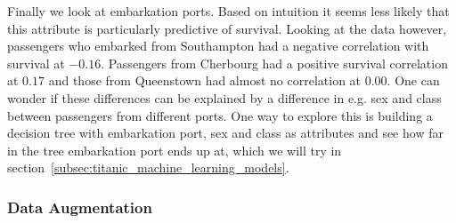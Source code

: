 \documentclass[english, a4paper]{article}
\begin{document}
\noindent
Finally we look at embarkation ports. Based on intuition it seems less likely that this attribute is particularly predictive of survival. Looking at the data however, passengers who embarked from Southampton had a negative correlation with survival at $-0.16$. Passengers from Cherbourg had a positive survival correlation at $0.17$ and those from Queenstown had almost no correlation at $0.00$. One can wonder if these differences can be explained by a difference in e.g. sex and class between passengers from different ports. One way to explore this is building a decision tree with embarkation port, sex and class as attributes and see how far in the tree embarkation port ends up at, which we will try in section~\ref{subsec:titanic_machine_learning_models}.
\subsubsection{Data Augmentation}
\end{document}
